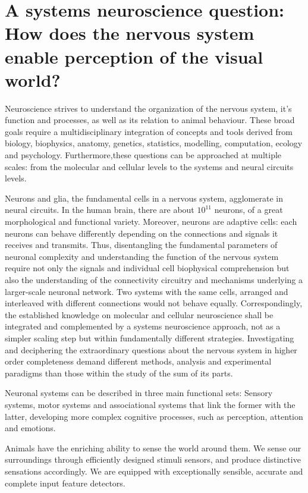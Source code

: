 \section{A systems neuroscience question: How does the nervous system enable perception of the visual world?}
\label{sec:int_motivation}

Neuroscience strives to understand the organization of the nervous system, it's function and processes, as well as its relation to animal behaviour. These broad goals require a multidisciplinary integration of concepts and tools derived from biology, biophysics, anatomy, genetics, statistics, modelling, computation, ecology and psychology. Furthermore,these questions can be approached at multiple scales: from the molecular and cellular levels to the systems and neural circuits levels.

Neurons and glia, the fundamental cells in a nervous system, agglomerate in neural circuits. In the human brain, there are about $10^11$ neurons, of a great morphological and functional variety. Moreover, neurons are adaptive cells: each neurons can behave differently depending on the connections and signals it receives and transmits. 
Thus, disentangling the fundamental parameters of neuronal complexity and understanding the function of the nervous system require not only the signals and individual cell biophysical comprehension but also the understanding of the connectivity circuitry and mechanisms underlying a larger-scale neuronal network. Two systems with the same cells, arranged and interleaved with different connections would not behave equally. Correspondingly, the established knowledge on molecular and cellular neuroscience shall be integrated and complemented by a systems neuroscience approach, not as a simpler scaling step but within fundamentally different strategies. Investigating and deciphering the extraordinary questions about the nervous system in higher order completeness demand different methods, analysis and experimental paradigms than those within the study of the sum of its parts.

Neuronal systems can be described in three main functional sets: Sensory systems, motor systems and associational systems that link the former with the latter, developing more complex cognitive processes, such as perception, attention and emotions.

Animals have the enriching ability to sense the world around them. We sense our surroundings through efficiently designed stimuli sensors, and produce distinctive sensations accordingly. We are equipped with exceptionally sensible, accurate and complete input feature detectors.

